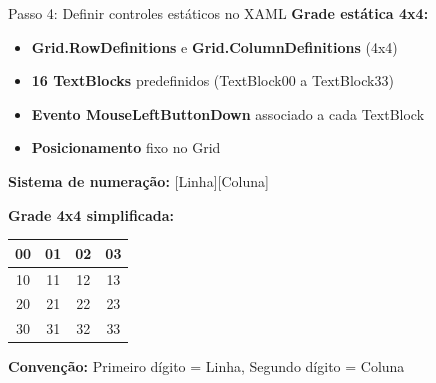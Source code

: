 \documentclass[aspectratio=169]{beamer}
\begin{document}
\begin{frame}{Passo 4: Definir controles estáticos no XAML}
\textbf{Grade estática 4x4:}
\begin{itemize}
    \item \textbf{Grid.RowDefinitions} e \textbf{Grid.ColumnDefinitions} (4x4)
    \item \textbf{16 TextBlocks} predefinidos (TextBlock00 a TextBlock33)
    \item \textbf{Evento MouseLeftButtonDown} associado a cada TextBlock
    \item \textbf{Posicionamento} fixo no Grid
\end{itemize}

\textbf{Sistema de numeração:} [Linha][Coluna]

\textbf{Grade 4x4 simplificada:}
\begin{center}
\begin{tabular}{|c|c|c|c|}
\hline
00 & 01 & 02 & 03 \\
\hline
10 & 11 & 12 & 13 \\
\hline
20 & 21 & 22 & 23 \\
\hline
30 & 31 & 32 & 33 \\
\hline
\end{tabular}
\end{center}

\textbf{Convenção:} Primeiro dígito = Linha, Segundo dígito = Coluna
\end{frame}
\end{document}
